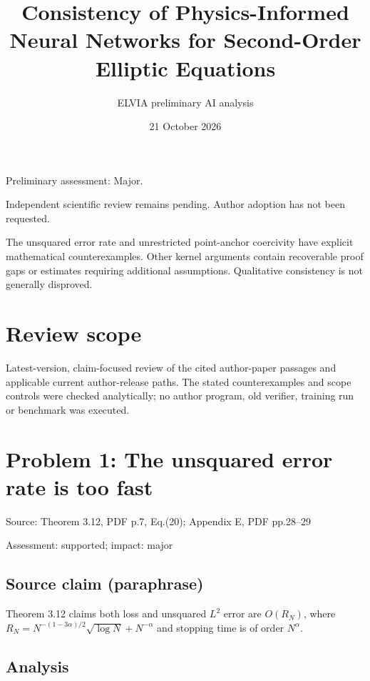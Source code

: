 \documentclass[11pt]{article}
\begin{document}
\title{Consistency of Physics-Informed Neural Networks for Second-Order Elliptic Equations}

\author{ELVIA preliminary AI analysis}\date{21 October 2026}\maketitle

Preliminary assessment: Major.\par

Independent scientific review remains pending. Author adoption has not been requested.

The unsquared error rate and unrestricted point-anchor coercivity have explicit mathematical counterexamples. Other kernel arguments contain recoverable proof gaps or estimates requiring additional assumptions. Qualitative consistency is not generally disproved.

\section*{Review scope}

Latest-version, claim-focused review of the cited author-paper passages and applicable current author-release paths. The stated counterexamples and scope controls were checked analytically; no author program, old verifier, training run or benchmark was executed.

\section*{Problem 1: The unsquared error rate is too fast}

Source: Theorem 3.12, PDF p.7, Eq.(20); Appendix E, PDF pp.28–29

Assessment: supported; impact: major

\subsection*{Source claim (paraphrase)}

Theorem 3.12 claims both loss and unsquared \(L^2\) error are \(O(R_N)\), where \(R_N=N^{-(1-3\alpha)/2}\sqrt{\log N}+N^{-\alpha}\) and stopping time is of order \(N^\alpha\).

\subsection*{Analysis}
\end{document}
